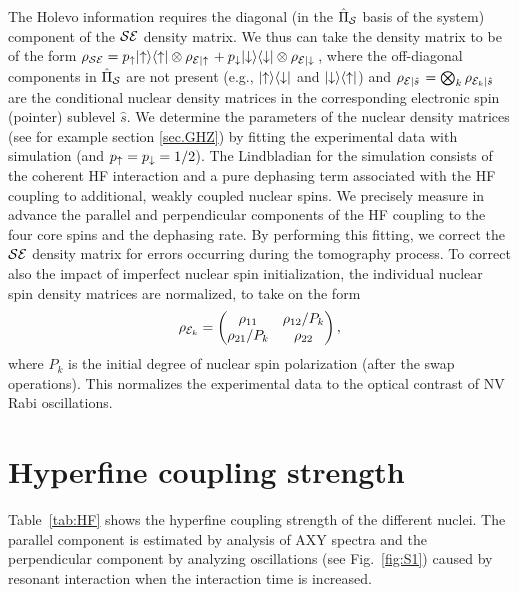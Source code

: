 \documentclass[aps,floatfix,footinbib,superscriptaddress]{revtex4-1}
\begin{document}
The Holevo information requires the diagonal (in the $\hat{\Pi}_{\mathcal{S}}$ basis of the system) component of the $\mathcal{S}\mathcal{E}$ density matrix. We thus can take the density matrix to be of the form $\rho_{\mathcal{S}\mathcal{E}}= p_{\mathord{\uparrow}} |\mathord{\uparrow}\rangle\langle\mathord{\uparrow}| \otimes \rho_{\mathcal{E}\left|\mathord{\uparrow}\right.} + p_{\mathord{\downarrow}} |\mathord{\downarrow}\rangle\langle\mathord{\downarrow}| \otimes \rho_{\mathcal{E}\left|\mathord{\downarrow}\right.}$, where the off-diagonal components in $\hat{\Pi}_{\mathcal{S}}$ are not present (e.g., $|\mathord{\uparrow}\rangle\langle\mathord{\downarrow}|$ and $|\mathord{\downarrow}\rangle\langle\mathord{\uparrow}|$) and $\rho_{\mathcal{E}\left|\hat{s}\right.}=\bigotimes_k \rho_{\mathcal{E}_k\left|\hat{s}\right.}$ are the conditional nuclear density matrices in the corresponding electronic spin (pointer) sublevel $\hat{s}$. We determine the parameters of the nuclear density matrices (see for example section \ref{sec.GHZ}) by fitting the experimental data with simulation (and $p_{\mathord{\uparrow}} = p_{\mathord{\downarrow}} = 1/2$). The Lindbladian for the simulation consists of the coherent HF interaction and a pure dephasing term associated with the HF coupling to additional, weakly coupled nuclear spins. We precisely measure in advance the parallel and perpendicular components of the HF coupling to the four core spins and the dephasing rate. By performing this fitting, we correct the $\mathcal{S}\mathcal{E}$ density matrix for errors occurring during the tomography process. To correct also the impact of imperfect nuclear spin initialization, the individual nuclear spin density matrices are normalized, to take on the form 
\begin{equation}
\rho_{\mathcal{E}_k} = \begin{pmatrix}
\rho_{11} & \rho_{12}/P_k\\
\rho_{21}/P_k & \rho_{22}
\end{pmatrix} ,
\end{equation}
where $P_k$ is the initial degree of nuclear spin polarization (after the swap operations). This normalizes the experimental data to the optical contrast of NV Rabi oscillations. 

\section{Hyperfine coupling strength}\label{sec.hf}

Table~\ref{tab:HF} shows the hyperfine coupling strength of the different nuclei. The parallel component is estimated by analysis of AXY spectra and the perpendicular component by analyzing oscillations (see Fig.~\ref{fig:S1}) caused by resonant interaction when the interaction time is increased. 
\end{document}
